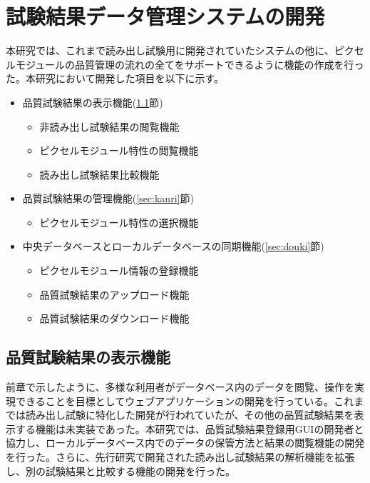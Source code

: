 \chapter{試験結果データ管理システムの開発}
\label{sec:chap7}

本研究では、これまで読み出し試験用に開発されていたシステムの他に、ピクセルモジュールの品質管理の流れの全てをサポートできるように機能の作成を行った。本研究において開発した項目を以下に示す。
\begin{itemize}
  \item[1.] 品質試験結果の表示機能(\ref{sec:hyouji}節)
  \begin{itemize}
    \item 非読み出し試験結果の閲覧機能
    \item ピクセルモジュール特性の閲覧機能
    \item 読み出し試験結果比較機能
  \end{itemize}
  \item[2.] 品質試験結果の管理機能(\ref{sec:kanri}節)
  \begin{itemize}
    \item ピクセルモジュール特性の選択機能
  \end{itemize}
  \item[3.] 中央データベースとローカルデータベースの同期機能(\ref{sec:douki}節)
  \begin{itemize}
    \item ピクセルモジュール情報の登録機能
    \item 品質試験結果のアップロード機能
    \item 品質試験結果のダウンロード機能
  \end{itemize}
\end{itemize}

\section{品質試験結果の表示機能}
\label{sec:hyouji}

前章で示したように、多様な利用者がデータベース内のデータを閲覧、操作を実現できることを目標としてウェブアプリケーションの開発を行っている。これまでは読み出し試験に特化した開発が行われていたが、その他の品質試験結果を表示する機能は未実装であった。本研究では、品質試験結果登録用GUIの開発者と協力し、ローカルデータベース内でのデータの保管方法と結果の閲覧機能の開発を行った。さらに、先行研究で開発された読み出し試験結果の解析機能を拡張し、別の試験結果と比較する機能の開発を行った。

